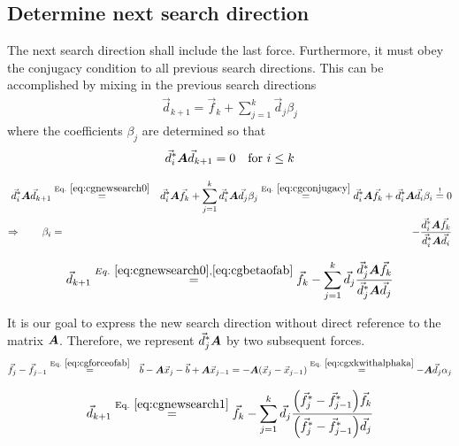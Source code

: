 \documentclass[11pt,a4paper]{report}
\begin{document}
\subsection{Determine next search direction}
The next search direction shall include the last force.  Furthermore,
it must obey the conjugacy condition to all previous search
directions. This can be accomplished by mixing in the previous search
directions
\begin{eqnarray}
\vec{d}_{k+1}=\vec{f}_k+\sum_{j=1}^{k}\vec{d}_j\beta_j
\label{eq:cgnewsearch0}
\end{eqnarray}
where the coefficients $\beta_j$ are determined so that
\begin{eqnarray}
\vec{d}^*_i\bm{A}\vec{d}_{k+1}=0\quad\text{for $i\le k$}
\end{eqnarray}

\begin{eqnarray}
\vec{d}^*_i\mat{A}\vec{d}_{k+1}&\eqrel{eq:cgnewsearch0}{=}&
\vec{d}^*_i\mat{A}\vec{f}_k
+\sum_{j=1}^{k}\vec{d}^*_i\mat{A}\vec{d}_j\beta_j 
\eqrel{eq:cgconjugacy}{=}
\vec{d}^*_i\mat{A}\vec{f}_k
+\vec{d}^*_i\mat{A}\vec{d}_i\beta_i\stackrel{!}{=}0
\nonumber\\
\Rightarrow\qquad
\beta_i&=&-\frac{\vec{d}^*_i\mat{A}\vec{f}_k}{\vec{d}^*_i\mat{A}\vec{d}_i}
\label{eq:cgbetaofab}
\end{eqnarray}

\begin{eqnarray}
\vec{d}_{k+1}
\stackrel{Eq.~\ref{eq:cgnewsearch0},\ref{eq:cgbetaofab}}{=}
\vec{f}_k-\sum_{j=1}^{k}\vec{d}_j
\frac{\vec{d}^*_j\bm{A}\vec{f}_k}{\vec{d}^*_j\bm{A}\vec{d}_j}
\label{eq:cgnewsearch1}
\end{eqnarray}

It is our goal to express the new search direction without direct
reference to the matrix $\bm{A}$. Therefore, we represent
$\vec{d}^*_j\bm{A}$ by two subsequent forces.
\begin{eqnarray}
\vec{f}_j-\vec{f}_{j-1}&\eqrel{eq:cgforceofab}{=}&
\vec{b}-\mat{A}\vec{x}_j-\vec{b}+\mat{A}\vec{x}_{j-1}
=-\mat{A}(\vec{x}_j-\vec{x}_{j-1})
\eqrel{eq:cgxkwithalphaka}{=}
-\mat{A}\vec{d}_j\alpha_j
\end{eqnarray}


\begin{eqnarray}
\vec{d}_{k+1}\eqrel{eq:cgnewsearch1}{=}\vec{f}_k
-\sum_{j=1}^{k}\vec{d}_j
\frac{\Bigl(\vec{f}_j^*-\vec{f}_{j-1}^*\Bigr)\vec{f}_k}
{\Bigl(\vec{f}_j^*-\vec{f}_{j-1}^*\Bigr)\vec{d}_j}
\label{eq:cgnewsearch2}
\end{eqnarray}
\end{document}
